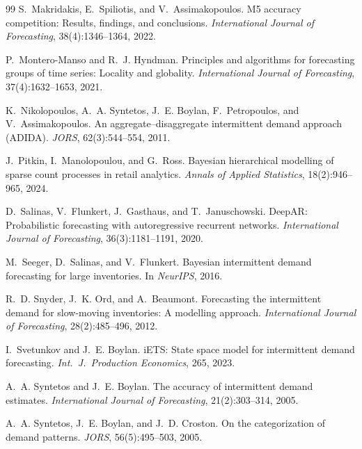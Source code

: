 \documentclass[twocolumn,10pt]{article}
\begin{document}
\begin{thebibliography}{99}
S.~Makridakis, E.~Spiliotis, and V.~Assimakopoulos.
\newblock M5 accuracy competition: Results, findings, and conclusions.
\newblock \emph{International Journal of Forecasting}, 38(4):1346--1364, 2022.

P.~Montero-Manso and R.~J. Hyndman.
\newblock Principles and algorithms for forecasting groups of time
  series: Locality and globality.
\newblock \emph{International Journal of Forecasting}, 37(4):1632--1653,
  2021.

K.~Nikolopoulos, A.~A. Syntetos, J.~E. Boylan, F.~Petropoulos, and
  V.~Assimakopoulos.
\newblock An aggregate--disaggregate intermittent demand approach (ADIDA).
\newblock \emph{JORS}, 62(3):544--554, 2011.

J.~Pitkin, I.~Manolopoulou, and G.~Ross.
\newblock Bayesian hierarchical modelling of sparse count processes in
  retail analytics.
\newblock \emph{Annals of Applied Statistics}, 18(2):946--965, 2024.

D.~Salinas, V.~Flunkert, J.~Gasthaus, and T.~Januschowski.
\newblock DeepAR: Probabilistic forecasting with autoregressive recurrent
  networks.
\newblock \emph{International Journal of Forecasting}, 36(3):1181--1191, 2020.

M.~Seeger, D.~Salinas, and V.~Flunkert.
\newblock Bayesian intermittent demand forecasting for large inventories.
\newblock In \emph{NeurIPS}, 2016.

R.~D. Snyder, J.~K. Ord, and A.~Beaumont.
\newblock Forecasting the intermittent demand for slow-moving
  inventories: A modelling approach.
\newblock \emph{International Journal of Forecasting}, 28(2):485--496,
  2012.

I.~Svetunkov and J.~E. Boylan.
\newblock iETS: State space model for intermittent demand forecasting.
\newblock \emph{Int.\ J.\ Production Economics}, 265, 2023.

A.~A. Syntetos and J.~E. Boylan.
\newblock The accuracy of intermittent demand estimates.
\newblock \emph{International Journal of Forecasting}, 21(2):303--314, 2005.

A.~A. Syntetos, J.~E. Boylan, and J.~D. Croston.
\newblock On the categorization of demand patterns.
\newblock \emph{JORS}, 56(5):495--503, 2005.


\end{thebibliography}
\end{document}
